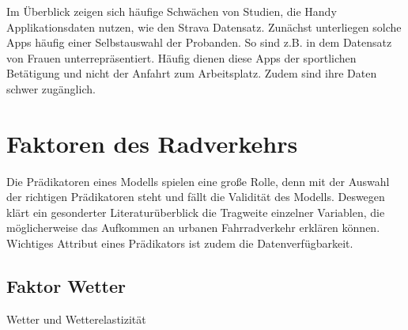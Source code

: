 \documentclass[a4paper,12pt]{thesis}
\begin{document}
Im Überblick zeigen sich häufige Schwächen von Studien, die Handy Applikationsdaten nutzen, wie den Strava Datensatz. Zunächst unterliegen solche Apps häufig einer Selbstauswahl der Probanden. So sind z.B. in dem Datensatz von \cite{Alattar2021} Frauen unterrepräsentiert. Häufig dienen diese Apps der sportlichen Betätigung und nicht der Anfahrt zum Arbeitsplatz. Zudem sind ihre Daten schwer zugänglich.


\section{Faktoren des Radverkehrs}

Die Prädikatoren eines Modells spielen eine große Rolle, denn mit der Auswahl der richtigen Prädikatoren steht und fällt die Validität des Modells. Deswegen klärt ein gesonderter Literaturüberblick die Tragweite einzelner Variablen, die möglicherweise das Aufkommen an urbanen Fahrradverkehr erklären können. Wichtiges Attribut eines Prädikators ist zudem die Datenverfügbarkeit. 

\subsection{Faktor Wetter}

Wetter und Wetterelastizität
\end{document}

